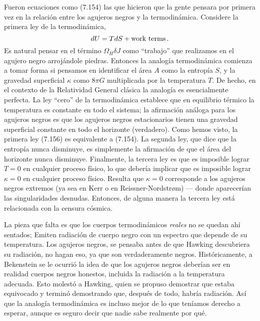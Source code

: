 \documentclass[11pt,b5paper,openany,twoside]{book}
\begin{document}
Fueron ecuaciones como (7.154) las que hicieron que la gente pensara por primera vez en la relación entre los agujeros negros y la termodinámica.
Considere la primera ley de la termodinámica,
\begin{equation}
dU = TdS + {\rm work~ terms}\,.\label{7.156}
\end{equation}
Es natural pensar en el término $\Omega_H\delta J$ como ``trabajo'' que realizamos en el agujero negro arrojándole piedras.
Entonces la analogía termodinámica comienza a tomar forma si pensamos en identificar el área $A$ como la entropía $S$, y la gravedad superficial $\kappa$ como $8\pi G$ multiplicada por la temperatura $T$.
De hecho, en el contexto de la Relatividad General clásica la analogía es esencialmente perfecta.
La ley ``cero'' de la termodinámica establece que en equilibrio térmico la temperatura es constante en todo el sistema; la afirmación análoga para los agujeros negros es que los agujeros negros estacionarios tienen una gravedad superficial constante en todo el horizonte (verdadero).
Como hemos visto, la primera ley (7.156) es equivalente a (7.154).
La segunda ley, que dice que la entropía nunca disminuye, es simplemente la afirmación de que el área del horizonte nunca disminuye.
Finalmente, la tercera ley es que es imposible lograr $T=0$ en cualquier proceso físico, lo que debería implicar que es imposible lograr $\kappa=0$ en cualquier proceso físico.
Resulta que $\kappa=0$ corresponde a los agujeros negros extremos (ya sea en Kerr o en Reissner-Nordstr{\o}m) --- donde aparecerían las singularidades desnudas.
Entonces, de alguna manera la tercera ley está relacionada con la censura cósmica.

La pieza que falta es que los cuerpos termodinámicos {\it reales} no se quedan ahí sentados; Emiten radiación de cuerpo negro con un espectro que depende de su temperatura.
Los agujeros negros, se pensaba antes de que Hawking descubriera su radiación, no hagan eso, ya que son verdaderamente negros.
Históricamente, a Bekenstein se le ocurrió la idea de que los agujeros negros deberían ser en realidad cuerpos negros honestos, incluida la radiación a la temperatura adecuada.
Esto molestó a Hawking, quien se propuso demostrar que estaba equivocado y terminó demostrando que, después de todo, habría radiación.
Así que la analogía termodinámica es incluso mejor de lo que teníamos derecho a esperar, aunque es seguro decir que nadie sabe realmente por qué.
\end{document}
